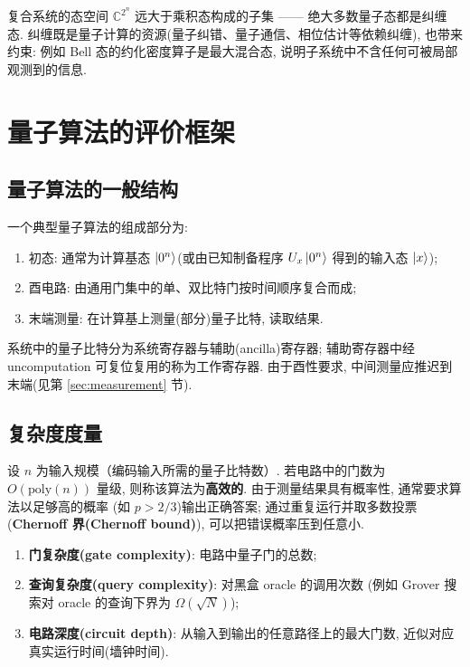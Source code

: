 \documentclass[utf8]{article} %
\numberwithin{equation}{section}   %
\newtheorem{Def}{\hskip 2em {\color{green} 定义}}[subsection]
\newtheorem{Note}{\hskip 2em {\color{red} 注}}[subsection]
\begin{document}
\begin{Note}
    复合系统的态空间 $\mathbb{C}^{2^n}$ 远大于乘积态构成的子集 —— 绝大多数量子态都是纠缠态.
    纠缠既是量子计算的资源(量子纠错、量子通信、相位估计等依赖纠缠), 也带来约束:
    例如 Bell 态的约化密度算子是最大混合态, 说明子系统中不含任何可被局部观测到的信息.
\end{Note}

\section{量子算法的评价框架}

\subsection{量子算法的一般结构}

\begin{Def}
    一个典型量子算法的组成部分为:
    \begin{enumerate}
        \item 初态: 通常为计算基态 $\ket{0^n}$(或由已知制备程序 $U_x \ket{0^n}$ 得到的输入态 $\ket{x}$);
        \item 酉电路: 由通用门集中的单、双比特门按时间顺序复合而成;
        \item 末端测量: 在计算基上测量(部分)量子比特, 读取结果.
    \end{enumerate}
    系统中的量子比特分为系统寄存器与辅助(ancilla)寄存器; 辅助寄存器中经 uncomputation
    可复位复用的称为工作寄存器. 由于酉性要求, 中间测量应推迟到末端(见第 \ref{sec:measurement} 节).
\end{Def}

\subsection{复杂度度量}

\begin{Def}[高效算法]
    设 $n$ 为输入规模（编码输入所需的量子比特数）. 若电路中的门数为 $O(\mathrm{poly}(n))$ 量级,
    则称该算法为\textbf{高效的}. 由于测量结果具有概率性, 通常要求算法以足够高的概率
    (如 $p > 2/3$)输出正确答案; 通过重复运行并取多数投票(\textbf{Chernoff 界(Chernoff bound)}), 可以把错误概率压到任意小.
\end{Def}

\begin{Def}[三种复杂度]
    \begin{enumerate}
        \item \textbf{门复杂度(gate complexity)}: 电路中量子门的总数;
        \item \textbf{查询复杂度(query complexity)}: 对黑盒 oracle 的调用次数
        (例如 Grover 搜索对 oracle 的查询下界为 $\Omega(\sqrt{N})$);
        \item \textbf{电路深度(circuit depth)}: 从输入到输出的任意路径上的最大门数,
        近似对应真实运行时间(墙钟时间).
    \end{enumerate}
\end{Def}
\end{document}

